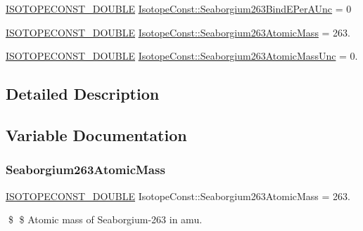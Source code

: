 \begin{DoxyCompactItemize}
\mbox{\hyperlink{group___isotope_const-_macros_ga8f45a7272ce02c0b4c65c44636ed719a}{I\+S\+O\+T\+O\+P\+E\+C\+O\+N\+S\+T\+\_\+\+D\+O\+U\+B\+LE}} \mbox{\hyperlink{group___isotope_const-_seaborgium-_sg263_gae8bfc0ba0f4fe33eb08e662a2a776574}{Isotope\+Const\+::\+Seaborgium263\+Bind\+E\+Per\+A\+Unc}} = 0
\item 
\mbox{\hyperlink{group___isotope_const-_macros_ga8f45a7272ce02c0b4c65c44636ed719a}{I\+S\+O\+T\+O\+P\+E\+C\+O\+N\+S\+T\+\_\+\+D\+O\+U\+B\+LE}} \mbox{\hyperlink{group___isotope_const-_seaborgium-_sg263_gae01e4b3ba589a78ba00666735da4d0d8}{Isotope\+Const\+::\+Seaborgium263\+Atomic\+Mass}} = 263.
\item 
\mbox{\hyperlink{group___isotope_const-_macros_ga8f45a7272ce02c0b4c65c44636ed719a}{I\+S\+O\+T\+O\+P\+E\+C\+O\+N\+S\+T\+\_\+\+D\+O\+U\+B\+LE}} \mbox{\hyperlink{group___isotope_const-_seaborgium-_sg263_gada381ed97459ef9233ba0da1b8777854}{Isotope\+Const\+::\+Seaborgium263\+Atomic\+Mass\+Unc}} = 0.
\end{DoxyCompactItemize}


\subsection{Detailed Description}


\subsection{Variable Documentation}
\mbox{\label{group___isotope_const-_seaborgium-_sg263_gae01e4b3ba589a78ba00666735da4d0d8}} 
\subsubsection{\texorpdfstring{Seaborgium263\+Atomic\+Mass}{Seaborgium263AtomicMass}}
{\footnotesize\ttfamily \mbox{\hyperlink{group___isotope_const-_macros_ga8f45a7272ce02c0b4c65c44636ed719a}{I\+S\+O\+T\+O\+P\+E\+C\+O\+N\+S\+T\+\_\+\+D\+O\+U\+B\+LE}} Isotope\+Const\+::\+Seaborgium263\+Atomic\+Mass = 263.}

\$ \$ Atomic mass of Seaborgium-\/263 in amu. \mbox{\label{group___isotope_const-_seaborgium-_sg263_gada381ed97459ef9233ba0da1b8777854}} 
